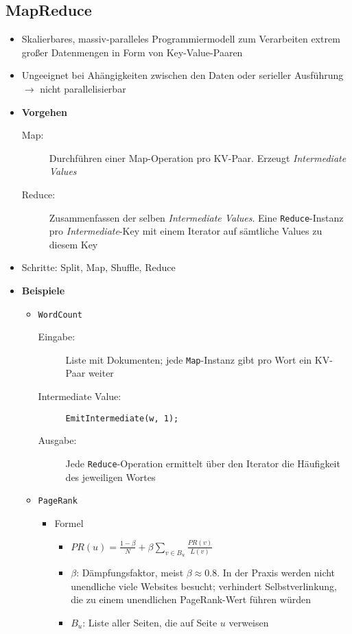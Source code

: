 \subsection{MapReduce}
\begin{itemize}
	\item Skalierbares, massiv-paralleles Programmiermodell zum Verarbeiten extrem großer Datenmengen in Form von Key-Value-Paaren
	\item Ungeeignet bei Ahängigkeiten zwischen den Daten oder serieller Ausführung \(\rightarrow\)  nicht parallelisierbar
	\item \textbf{Vorgehen}
	\begin{description}
		\item[Map:] Durchführen einer Map-Operation pro KV-Paar. Erzeugt \textit{Intermediate Values}
		\item[Reduce:] Zusammenfassen der selben \textit{Intermediate Values}. Eine \texttt{Reduce}-Instanz pro \textit{Intermediate}-Key mit einem Iterator auf sämtliche Values zu diesem Key
	\end{description}
	\item Schritte: Split, Map, Shuffle, Reduce
	\item \textbf{Beispiele}
	\begin{itemize}
		\item \texttt{WordCount}
		\begin{description}
			\item[Eingabe:] Liste mit Dokumenten; jede \texttt{Map}-Instanz gibt pro Wort ein KV-Paar weiter
			\item[Intermediate Value:] \texttt{EmitIntermediate(w, 1);}
			\item[Ausgabe:] Jede \texttt{Reduce}-Operation ermittelt über den Iterator die Häufigkeit des jeweiligen Wortes
		\end{description}
		\item \texttt{PageRank}
		\begin{itemize}
			\item Formel
			\begin{itemize}
				\item \(PR(u) = \frac{1-\beta}{N} + \beta \sum_{v \in B_u}\frac{PR(v)}{L(v)}\)
				\item \(\beta\): Dämpfungsfaktor, meist \(\beta \approx 0.8\). In der Praxis werden nicht unendliche viele Websites besucht; verhindert Selbstverlinkung, die zu einem unendlichen PageRank-Wert führen würden
				\item \(B_u\): Liste aller Seiten, die auf Seite \(u\) verweisen

\end{itemize}
\end{itemize}
\end{itemize}
\end{itemize}
